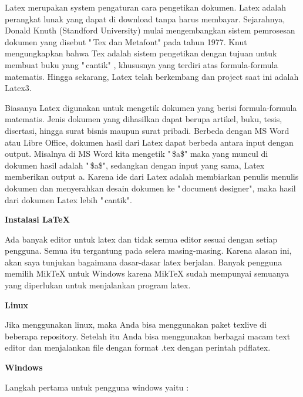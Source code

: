\hspace{0,5in}Latex merupakan system pengaturan cara pengetikan dokumen. Latex adalah perangkat lunak yang dapat di download tanpa harus membayar. Sejarahnya, Donald Knuth (Standford University) mulai mengembangkan sistem pemrosesan dokumen yang disebut "\,Tex dan Metafont" pada tahun 1977. Knut mengungkapkan bahwa Tex adalah sistem pengetikan dengan tujuan 
untuk membuat buku yang "\,cantik" , khususnya yang terdiri atas formula-formula matematis. Hingga sekarang, Latex telah berkembang dan project saat ini adalah Latex3.\par \vspace{12pt}

\hspace{0,3in}Biasanya Latex digunakan untuk mengetik dokumen yang berisi formula-formula matematis. Jenis dokumen yang dihasilkan dapat berupa artikel, buku, tesis, disertasi, hingga surat bisnis maupun surat pribadi. Berbeda dengan MS Word atau Libre Office, dokumen hasil dari Latex dapat berbeda antara input dengan output. Misalnya di MS Word kita mengetik "\,\$a\$" maka yang muncul di dokumen hasil adalah "\,\$a\$", sedangkan dengan input yang sama, Latex memberikan output a. Karena ide dari Latex adalah membiarkan penulis menulis dokumen dan menyerahkan desain dokumen ke "\,document designer", maka hasil dari dokumen Latex lebih "\,cantik".\par \vspace{12pt}

\textbf{Instalasi LaTeX}\par \vspace{8pt}

Ada banyak editor untuk latex dan tidak semua editor sesuai dengan setiap pengguna. Semua itu tergantung pada selera masing-masing. Karena alasan ini, akan saya tunjukan bagaimana dasar-dasar latex berjalan. Banyak pengguna memilih MikTeX untuk Windows karena MikTeX sudah mempunyai semuanya yang diperlukan untuk menjalankan program latex. 
\par \vspace{12pt}
\textbf{Linux}
\par \vspace{8pt}
Jika menggunakan linux, maka Anda bisa menggunakan paket texlive di beberapa repository. Setelah itu Anda bisa menggunakan berbagai macam text editor dan menjalankan file dengan format .tex dengan perintah pdflatex.
\par \vspace{12pt}
\textbf{Windows}
\par \vspace{12pt}
Langkah pertama untuk pengguna windows yaitu :

